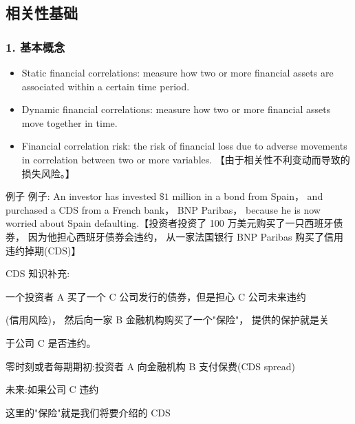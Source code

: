 \subsection{相关性基础}


\subsubsection{1. 基本概念}


\begin{itemize}
\item Static financial correlations: measure how two or more financial assets are associated within a certain time period.
\end{itemize}

\begin{itemize}
\item Dynamic financial correlations: measure how two or more financial assets move together in time.
\end{itemize}

\begin{itemize}
\item Financial correlation risk: the risk of financial loss due to adverse movements in correlation between two or more variables. 【由于相关性不利变动而导致的损失风险。】
\end{itemize}


\begin{example}{例子}
    例子: An investor has invested \(\$ 1\) million in a bond from Spain， and purchased a CDS from a French bank， BNP Paribas， because he is now worried about Spain defaulting.【投资者投资了 100 万美元购买了一只西班牙债券， 因为他担心西班牙债券会违约， 从一家法国银行 BNP Paribas 购买了信用违约掉期(CDS)】
\end{example}




CDS 知识补充:

\hspace*{1em} 一个投资者 \(\mathrm{A}\) 买了一个 \(\mathrm{C}\) 公司发行的债券，但是担心 \(\mathrm{C}\) 公司未来违约

(信用风险)， 然后向一家 B 金融机构购买了一个"保险"， 提供的保护就是关

于公司 C 是否违约。

\checkmark 零时刻或者每期期初:投资者 A 向金融机构 B 支付保费(CDS spread)

\checkmark 未来:如果公司 C 违约

\checkmark 这里的"保险"就是我们将要介绍的 CDS

